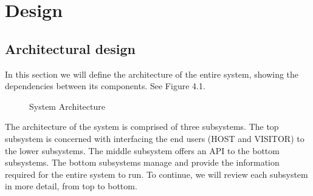 \chapter{Design}
\section{Architectural design}
In this section we will define the architecture of the entire system, showing the dependencies between its components. See Figure 4.1.

\begin{figure}
\noindent{}
\caption{System Architecture}
\end{figure}
The architecture of the system is comprised of three subsystems. The top subsystem is concerned with interfacing the end users (HOST and VISITOR) to the lower subsystems. The middle subsystem offers an API to the bottom subsystems. The bottom subsystems manage and provide the information required for the entire system to run. To continue, we will review each subsystem in more detail, from top to bottom.
\clearpage
